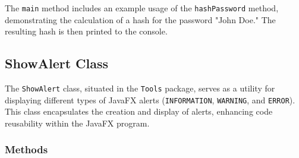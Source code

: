 \documentclass{article}
\begin{document}
The \texttt{main} method includes an example usage of the \texttt{hashPassword} method, demonstrating the calculation of a hash for the password "John Doe." The resulting hash is then printed to the console.

\subsection{ShowAlert Class}\label{show-alert}

The \texttt{ShowAlert} class, situated in the \texttt{Tools} package, serves as a utility for displaying different types of JavaFX alerts (\texttt{INFORMATION}, \texttt{WARNING}, and \texttt{ERROR}). This class encapsulates the creation and display of alerts, enhancing code reusability within the JavaFX program.

\subsubsection{Methods}
\end{document}
